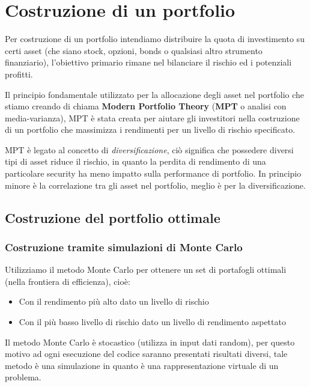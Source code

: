
\section{Costruzione di un portfolio}

Per costruzione di un portfolio intendiamo distribuire la quota di investimento su certi asset (che siano stock, opzioni, bonds o qualsiasi altro strumento finanziario), l'obiettivo primario rimane nel bilanciare il rischio ed i potenziali profitti.

Il principio fondamentale utilizzato per la allocazione degli asset nel portfolio che stiamo creando di chiama \textbf{Modern Portfolio Theory} (\textbf{MPT} o analisi con media-varianza), MPT è stata creata
per aiutare gli investitori nella costruzione di un portfolio che massimizza i rendimenti per un livello di rischio specificato.

MPT è legato al concetto di \emph{diversificazione}, ciò significa che possedere diversi tipi di asset riduce il rischio, in quanto la perdita di rendimento di una particolare security ha meno impatto
sulla performance di portfolio. In principio minore è la correlazione tra gli asset nel portfolio, meglio è per la diversificazione.

\subsection{Costruzione del portfolio ottimale}

\subsubsection{Costruzione tramite simulazioni di Monte Carlo}

Utilizziamo il metodo Monte Carlo per ottenere un set di portafogli ottimali (nella frontiera di efficienza), cioè:
\begin{itemize}
    \item Con il rendimento più alto dato un livello di rischio
    \item Con il più basso livello di rischio dato un livello di rendimento aspettato
\end{itemize}

Il metodo Monte Carlo è stocastico (utilizza in input dati random), per questo motivo ad ogni esecuzione del codice saranno presentati risultati diversi, tale metodo è una simulazione
in quanto è una rappresentazione virtuale di un problema.

